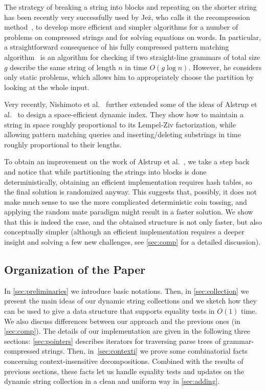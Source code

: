 \documentclass[a4paper]{article}
\theoremstyle{remark}
\begin{document}
The strategy of breaking a string into blocks and repeating on the shorter string has been
recently very successfully used by Jeż, who calls it the recompression method~\cite{JezRecompression},
to develop more efficient and simpler algorithms for a number of problems on compressed strings and for solving
equations on words. In particular, a straightforward consequence of his fully compressed pattern
matching algorithm~\cite{JezFully} is an algorithm for checking if two straight-line grammars
of total size $g$ describe the same string of length $n$ in time $O(g\log n)$.
However, he considers only static problems, which allows him to appropriately choose the partition 
by looking at the whole input.

Very recently, Nishimoto et al.~\cite{DBLP:journals/corr/NishimotoIIBT15} further extended
some of the ideas of Alstrup et al.~\cite{Alstrup} to design a space-efficient dynamic index.
They show how to maintain a string in space roughly proportional to its Lempel-Ziv factorization,
while allowing pattern matching queries and inserting/deleting substrings in time roughly proportional
to their lengths.

To obtain an improvement on the
work of Alstrup et al.~\cite{Alstrup}, we take a step back and notice that while partitioning
the strings into blocks is done deterministically, obtaining an efficient implementation
requires hash tables, so the final solution is randomized anyway. This suggests that, possibly, it does
not make much sense to use the more complicated deterministic coin tossing, and applying
the random mate paradigm might result in a faster solution. We show
that this is indeed the case, and the obtained structure is not only faster, but also conceptually
simpler (although an efficient implementation requires a deeper insight and solving a few new
challenges, see \cref{sec:comp} for a detailed discussion).

\subsection{Organization of the Paper}
In \cref{sec:preliminaries} we introduce basic notations.
Then, in \cref{sec:collection} we present the main ideas of our dynamic string collections
and we sketch how they can be used to give a data structure that supports equality tests in $O(1)$ time.
We also discuss differences between our approach and the previous ones (in \cref{sec:comp}).
The details of our implementation are given in the following three sections:
\cref{sec:pointers} describes iterators for traversing parse trees of grammar-compressed strings.
Then, in~\cref{sec:contexti} we prove some combinatorial facts concerning context-insensitive decompositions.
Combined with the results of previous sections, these facts let us handle equality tests and updates on the dynamic string collection in a clean and uniform way
in \cref{sec:adding}.
\end{document}
